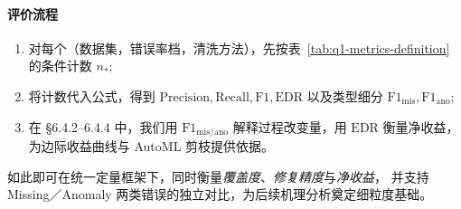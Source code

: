 \documentclass[10pt]{article} %
\numberwithin{equation}{section}
\begin{document}
\paragraph{评价流程}\;
\begin{enumerate}[label=\textbf{Step\,\arabic*.},itemindent=4em,leftmargin=0pt]
  \item 对每个（数据集，错误率档，清洗方法），先按表~\ref{tab:q1-metrics-definition} 的条件计数 \(n_{\ast}\);
  \item 将计数代入公式，得到 \(\mathrm{Precision},\mathrm{Recall},\mathrm{F1},\mathrm{EDR}\) 以及类型细分 \(\mathrm{F1}_{\mathrm{mis}},\mathrm{F1}_{\mathrm{ano}}\);
  \item 在 §6.4.2–6.4.4 中，我们用 \(\mathrm{F1}_{\mathrm{mis}/\mathrm{ano}}\) 解释过程改变量，用 \(\mathrm{EDR}\) 衡量净收益，为边际收益曲线与 AutoML 剪枝提供依据。
\end{enumerate}

\noindent
如此即可在统一定量框架下，同时衡量\emph{覆盖度}、\emph{修复精度}与\emph{净收益}，
并支持 Missing／Anomaly 两类错误的独立对比，为后续机理分析奠定细粒度基础。
\end{document}
